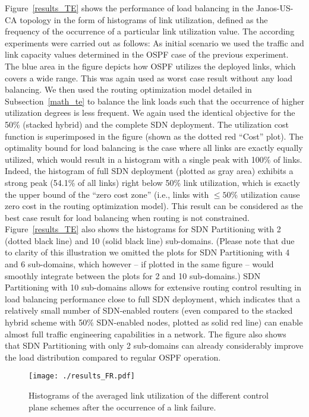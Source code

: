 \documentclass[journal]{IEEEtran}
\begin{document}
Figure~\ref{results_TE} shows the performance of load balancing in the Janos-US-CA topology in the form of histograms of link utilization, defined as the frequency of the occurrence of a particular link utilization value. The according experiments were carried out as follows: As initial scenario we used the traffic and link capacity values determined in the OSPF case of the previous experiment. The blue area in the figure depicts how OSPF utilizes the deployed links, which covers a wide range. This was again used as worst case result without any load balancing. We then used the routing optimization model detailed in Subsection~\ref{math_te} to balance the link loads such that the occurrence of higher utilization degrees is less frequent. We again used the identical objective for the 50\% (stacked hybrid) and the complete SDN deployment. The utilization cost function is superimposed in the figure (shown as the dotted red ``Cost'' plot). The optimality bound for load balancing is the case where all links are exactly equally utilized, which would result in a histogram with a single peak with 100\% of links. Indeed, the histogram of full SDN deployment (plotted as gray area) exhibits a strong peak (54.1\% of all links) right below 50\% link utilization, which is exactly the upper bound of the ``zero cost zone'' (i.e., links with $\leq 50\%$ utilization cause zero cost in the routing optimization model). This result can be considered as the best case result for load balancing when routing is not constrained. Figure~\ref{results_TE} also shows the histograms for SDN Partitioning with 2 (dotted black line) and 10 (solid black line) sub-domains. (Please note that due to clarity of this illustration we omitted the plots for SDN Partitioning with 4 and 6 sub-domains, which however -- if plotted in the same figure -- would smoothly integrate between the plots for 2 and 10 sub-domains.) SDN Partitioning with 10 sub-domains allows for extensive routing control resulting in load balancing performance close to full SDN deployment, which indicates that a relatively small number of SDN-enabled routers (even compared to the stacked hybrid scheme with 50\% SDN-enabled nodes, plotted as solid red line) can enable almost full traffic engineering capabilities in a network. The figure also shows that SDN Partitioning with only 2 sub-domains can already considerably improve the load distribution compared to regular OSPF operation.

\begin{figure}[t] \center
\texttt{[image: ./results\_FR.pdf]}
\caption{Histograms of the averaged link utilization of the different control plane schemes after the occurrence of a link failure.}
\label{results_FR} \end{figure}
\end{document}
